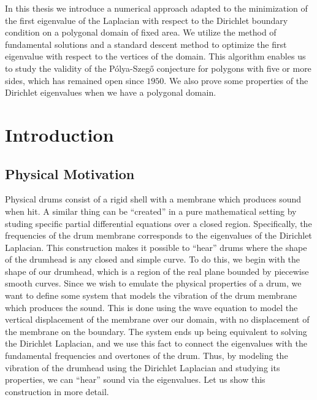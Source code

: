 \documentclass[12pt]{report}
\numberwithin{definition}{section}
\begin{document}
  In this thesis
  we introduce a numerical approach adapted to the minimization of the first eigenvalue of the Laplacian with respect to the Dirichlet boundary condition on a polygonal domain of fixed area.
  We utilize the method of fundamental solutions and a standard descent method to optimize the first eigenvalue with respect to the vertices of the domain.
  This algorithm enables us to study the validity of the Pólya-Szegő conjecture for polygons with five or more sides, which has remained open since $1950$.
  We also prove some properties of the Dirichlet eigenvalues when we have a polygonal domain.


  
\break





\tableofcontents


\newcommand{\comment}[1]{}


\break


\pagestyle{myheadings}



\chapter{Introduction}

\break
\section {Physical Motivation}


Physical drums consist of a rigid shell with a membrane which produces sound when hit.
A similar thing can be ``created'' in a pure mathematical setting by studing specific partial differential equations over a closed region.
Specifically, the frequencies of the drum membrane corresponds to the eigenvalues of the Dirichlet Laplacian.
This construction makes it possible to ``hear'' drums where the shape of the drumhead is any closed and simple curve.
To do this, we begin with the shape of our drumhead, which is a region of the real plane bounded by piecewise smooth curves.
Since we wish to emulate the physical properties of a drum, we want to define some system that models the vibration of the drum membrane which produces the sound.
This is done using the wave equation to model the vertical displacement of the membrane over our domain, with no displacement of the membrane on the boundary.
The system ends up being equivalent to solving the Dirichlet Laplacian, and we use this fact to connect the eigenvalues with the fundamental frequencies and overtones of the drum.
Thus, by modeling the vibration of the drumhead using the Dirichlet Laplacian and studying its properties, we can ``hear'' sound via the eigenvalues.
Let us show this construction in more detail.
\end{document}
